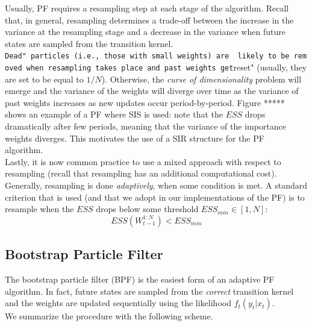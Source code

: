 \documentclass[
]{book}
\theoremstyle{break}
\theoremstyle{nonumberplain}
\begin{document}
Usually, PF requires a resampling step at each stage of the algorithm.
Recall that, in general, resampling determines a trade-off between the
increase in the variance at the resampling stage and a decrease in the
variance when future states are sampled from the transition kernel.\\
\texttt{Dead"\ particles\ (i.e.,\ those\ with\ small\ weights)\ are\ \ likely\ to\ be\ removed\ when\ resampling\ takes\ place\ and\ past\ weights\ get}reset"
(usually, they are set to be equal to \(1/N\)). Otherwise, the
\textit{curse of dimensionality} problem will emerge and the variance of
the weights will diverge over time as the variance of past weights
increases as new updates occur period-by-period. Figure ***** shows an
example of a PF where SIS is used: note that the \(ESS\) drops
dramatically after few periods, meaning that the variance of the
importance weights diverges. This motivates the use of a SIR structure
for the PF algorithm.~\\
Lastly, it is now common practice to use a mixed approach with respect
to resampling (recall that resampling has an additional computational
cost). Generally, resampling is done \textit{adaptively}, when some
condition is met. A standard criterion that is used (and that we adopt
in our implementations of the PF) is to resample when the \(ESS\) drops
below some threshold \(ESS_{min}\in [1,N]\): \begin{equation}
    ESS(W_{t-1}^{1:N})<ESS_{min}
\end{equation}

\subsection{Bootstrap Particle Filter}

The bootstrap particle filter (BPF) is the easiest form of an adaptive
PF algorithm. In fact, future states are sampled from the
\textit{correct} transition kernel and the weights are updated
sequentially using the likelihood \(f_t(y_t|x_t)\).\\
We summarize the procedure with the following scheme.
\end{document}
